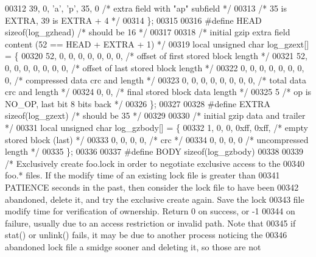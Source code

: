 \begin{DoxyCode}
00312     39, 0, \textcolor{charliteral}{'a'}, \textcolor{charliteral}{'p'}, 35, 0      \textcolor{comment}{/* extra field with "ap" subfield */}
00313                                 \textcolor{comment}{/* 35 is EXTRA, 39 is EXTRA + 4 */}
00314 \};
00315 
00316 \textcolor{preprocessor}{#define HEAD sizeof(log\_gzhead)     }\textcolor{comment}{/* should be 16 */}\textcolor{preprocessor}{}
00317 
00318 \textcolor{comment}{/* initial gzip extra field content (52 == HEAD + EXTRA + 1) */}
00319 local \textcolor{keywordtype}{unsigned} \textcolor{keywordtype}{char} log\_gzext[] = \{
00320     52, 0, 0, 0, 0, 0, 0, 0,    \textcolor{comment}{/* offset of first stored block length */}
00321     52, 0, 0, 0, 0, 0, 0, 0,    \textcolor{comment}{/* offset of last stored block length */}
00322     0, 0, 0, 0, 0, 0, 0, 0,     \textcolor{comment}{/* compressed data crc and length */}
00323     0, 0, 0, 0, 0, 0, 0, 0,     \textcolor{comment}{/* total data crc and length */}
00324     0, 0,                       \textcolor{comment}{/* final stored block data length */}
00325     5                           \textcolor{comment}{/* op is NO\_OP, last bit 8 bits back */}
00326 \};
00327 
00328 \textcolor{preprocessor}{#define EXTRA sizeof(log\_gzext)     }\textcolor{comment}{/* should be 35 */}\textcolor{preprocessor}{}
00329 
00330 \textcolor{comment}{/* initial gzip data and trailer */}
00331 local \textcolor{keywordtype}{unsigned} \textcolor{keywordtype}{char} log\_gzbody[] = \{
00332     1, 0, 0, 0xff, 0xff,        \textcolor{comment}{/* empty stored block (last) */}
00333     0, 0, 0, 0,                 \textcolor{comment}{/* crc */}
00334     0, 0, 0, 0                  \textcolor{comment}{/* uncompressed length */}
00335 \};
00336 
00337 \textcolor{preprocessor}{#define BODY sizeof(log\_gzbody)}
00338 
00339 \textcolor{comment}{/* Exclusively create foo.lock in order to negotiate exclusive access to the}
00340 \textcolor{comment}{   foo.* files.  If the modify time of an existing lock file is greater than}
00341 \textcolor{comment}{   PATIENCE seconds in the past, then consider the lock file to have been}
00342 \textcolor{comment}{   abandoned, delete it, and try the exclusive create again.  Save the lock}
00343 \textcolor{comment}{   file modify time for verification of ownership.  Return 0 on success, or -1}
00344 \textcolor{comment}{   on failure, usually due to an access restriction or invalid path.  Note that}
00345 \textcolor{comment}{   if stat() or unlink() fails, it may be due to another process noticing the}
00346 \textcolor{comment}{   abandoned lock file a smidge sooner and deleting it, so those are not}

\end{DoxyCode}
